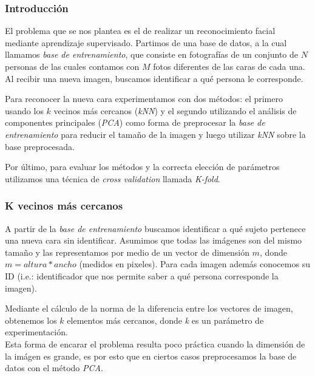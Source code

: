 \subsubsection*{Introducción}
\par El problema que se nos plantea es el de realizar un reconocimiento facial mediante aprendizaje supervisado. Partimos de una base de datos, a la cual llamamos \textit{base de entrenamiento},
que consiste en fotografías de un conjunto de $N$ personas de las cuales contamos con $M$ fotos diferentes de las caras de cada una. Al recibir una nueva imagen, buscamos identificar a qu\'e persona le corresponde. 
\par Para reconocer la nueva cara experimentamos con dos m\'etodos: el primero usando los $k$ vecinos m\'as cercanos (\textit{kNN}) y el segundo utilizando el an\'alisis de componentes principales (\textit{PCA}) como forma de preprocesar la \textit{base de entrenamiento} para reducir el tama\~{n}o de la imagen y luego utilizar \textit{kNN} sobre la base preprocesada. 
\par Por \'ultimo, para evaluar los m\'etodos y la correcta elecci\'on de par\'ametros utilizamos una t\'ecnica de \textit{cross validation} llamada \textit{K-fold}.

\subsubsection*{K vecinos m\'as cercanos}
\par A partir de la \textit{base de entrenamiento} buscamos identificar a qu\'e sujeto pertenece una nueva cara sin identificar. Asumimos que todas las imágenes son del mismo tamaño y las representamos por medio de un vector de dimensi\'on $m$, donde $m = altura*ancho$ (medidos en pixeles). Para cada imagen además conocemos su ID (i.e.: identificador que nos permite saber a qué persona corresponde la imagen).
\par Mediante el c\'alculo de la norma de la diferencia entre los vectores de imagen, obtenemos los $k$ elementos m\'as cercanos, donde \textit{k} es un parámetro de experimentación.\\
Esta forma de encarar el problema resulta poco pr\'actica cuando la dimensi\'on de la im\'agen es grande, es por esto que en ciertos casos preprocesamos la base de datos con el m\'etodo \textit{PCA}.

